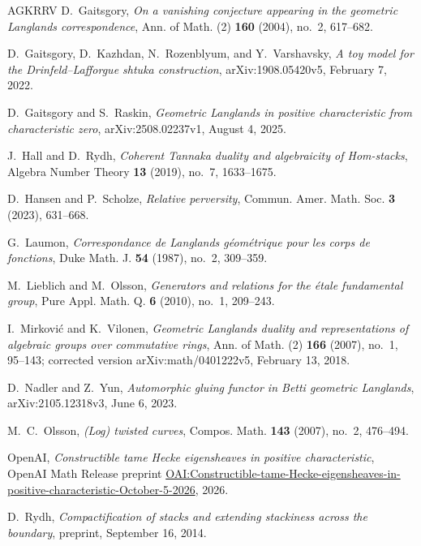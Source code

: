 \begin{thebibliography}{AGKRRV}
D.~Gaitsgory, \emph{On a vanishing conjecture appearing in the geometric
Langlands correspondence}, Ann. of Math. (2) \textbf{160} (2004),
no.~2, 617--682.

D.~Gaitsgory, D.~Kazhdan, N.~Rozenblyum, and Y.~Varshavsky,
\emph{A toy model for the Drinfeld--Lafforgue shtuka construction},
arXiv:1908.05420v5, February 7, 2022.

D.~Gaitsgory and S.~Raskin, \emph{Geometric Langlands in positive
characteristic from characteristic zero}, arXiv:2508.02237v1,
August 4, 2025.

J.~Hall and D.~Rydh, \emph{Coherent Tannaka duality and algebraicity of
Hom-stacks}, Algebra Number Theory \textbf{13} (2019), no.~7, 1633--1675.

D.~Hansen and P.~Scholze, \emph{Relative perversity},
Commun. Amer. Math. Soc. \textbf{3} (2023), 631--668.

G.~Laumon, \emph{Correspondance de Langlands g\'eom\'etrique pour les
corps de fonctions}, Duke Math. J. \textbf{54} (1987), no.~2, 309--359.

M.~Lieblich and M.~Olsson, \emph{Generators and relations for the
\'etale fundamental group}, Pure Appl. Math. Q. \textbf{6} (2010),
no.~1, 209--243.

I.~Mirkovi\'c and K.~Vilonen, \emph{Geometric Langlands duality and
representations of algebraic groups over commutative rings},
Ann. of Math. (2) \textbf{166} (2007), no.~1, 95--143;
corrected version arXiv:math/0401222v5, February 13, 2018.

D.~Nadler and Z.~Yun, \emph{Automorphic gluing functor in Betti
geometric Langlands}, arXiv:2105.12318v3, June 6, 2023.

M.~C.~Olsson, \emph{(Log) twisted curves}, Compos. Math.
\textbf{143} (2007), no.~2, 476--494.

OpenAI, \emph{Constructible tame Hecke eigensheaves in positive
characteristic}, OpenAI Math Release preprint
\href{https://github.com/openai/math/blob/main/preprints/Constructible-tame-Hecke-eigensheaves-in-positive-characteristic-October-5-2026/constructible-tame-hecke-eigensheaves-positive-characteristic.pdf}{OAI:Constructible-tame-Hecke-eigensheaves-in-positive-characteristic-October-5-2026},
2026.

D.~Rydh, \emph{Compactification of stacks and extending stackiness
across the boundary}, preprint, September 16, 2014.

\end{thebibliography}
